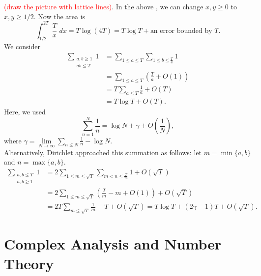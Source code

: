 \textcolor{red}{(draw the picture with lattice lines)}.  In the above , we can change $x,y \ge 0$ to $x,y \ge 1/2$.  Now the area is
\begin{equation*}
\int_{1/2}^{2T} \frac{T}{x} \,\, dx = T\log (4T)=T\log T+\text{an error bounded by } T.
\end{equation*}
We consider
\begin{align*}
\sum_{\substack{a,b \ge 1 \\ ab \le T}} 1 &= \sum_{1 \le a \le T} \sum_{1 \le b \le \frac{T}{a}} 1 \\
&= \sum_{1 \le a \le T} \left(\frac{T}{a}+O(1)\right) \\
&= T\sum_{a \le T} \frac{1}{a}+O(T) \\
&= T\log T+O(T).
\end{align*}
Here, we used
\begin{equation*}
\sum_{n=1}^{N} \frac{1}{n} = \log N+\gamma+O\left(\frac{1}{N}\right),
\end{equation*}
where $\gamma=\lim\limits_{N \to \infty} \sum_{n \le N} \frac{1}{n}-\log N$.\\
\indent Alternatively, Dirichlet approached this summation as follows:  let $m=\min\{a,b\}$ and $n=\max\{a,b\}$.
\begin{align*}
\sum_{\substack{a,b \le T \\ a,b \ge 1}}1 &= 2 \sum_{1 \le m \le \sqrt{T}} \sum_{m < n \le \frac{T}{m}}1+O(\sqrt{T}) \\
&= 2\sum_{1 \le m \le \sqrt{T}} \left(\frac{T}{m}-m+O(1)\right)+O(\sqrt{T}) \\
&= 2T\sum_{m \le \sqrt{T}} \frac{1}{m}-T+O(\sqrt{T})=T\log T+(2\gamma-1)T+O(\sqrt{T}).
\end{align*}

\section{Complex Analysis and Number Theory}

